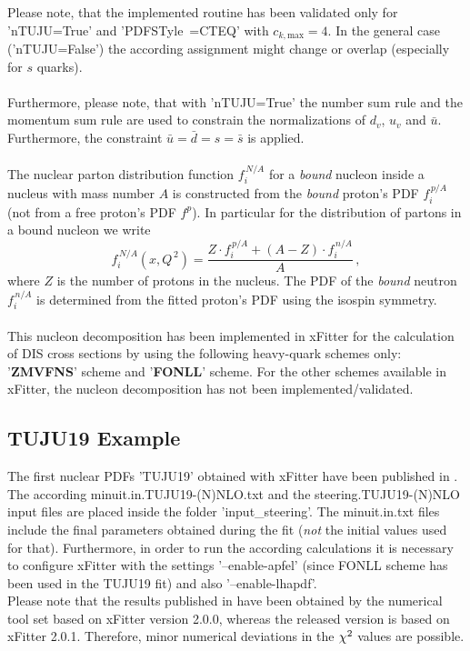 \documentclass{article}
\newcommand{\Chi}{\large{\chi}}
\begin{document}
\noindent Please note, that the implemented routine has been validated only for 'nTUJU=True' and '{PDFSTyle~=CTEQ}' with $c_{k,\mathrm{max}}=4$. In the general case ('nTUJU=False') the according assignment might change or overlap (especially for $s$ quarks).\\
\\
Furthermore, please note, that with 'nTUJU=True' the number sum rule and the momentum sum rule are used to constrain the normalizations of $d_v$, $u_v$ and $\bar{u}$. Furthermore, the constraint $\bar{u}=\bar{d}=s=\bar{s}$ is applied.\\
\\
The nuclear parton distribution function $f_i^{\,N/A}$ for a \textit{bound} nucleon inside a nucleus with mass number $A$ is constructed from the \textit{bound} proton's PDF $f_i^{\,p/A}$ (not from a free proton's PDF $f^p$). In particular for the distribution of partons in a bound nucleon we write
\begin{equation}
f_i^{\,N/A} \left( x,Q^{\,2} \right) = \frac{Z\cdot f_i^{\,p/A}+ (A-Z)\cdot f_i^{\,n/A}}{A}\,,
\label{eq:nucleon}
\end{equation} 
where $Z$ is the number of protons in the nucleus. The PDF of the \textit{bound} neutron~$f_i^{\,n/A}$ is determined from the fitted proton's PDF using the isospin symmetry.\\
\\
This nucleon decomposition has been implemented in xFitter for the calculation of DIS cross sections by using the following heavy-quark schemes only: '\textbf{ZMVFNS}' scheme and '\textbf{FONLL}' scheme. For the other schemes available in xFitter, the nucleon decomposition has not been implemented/validated.

\subsection{TUJU19 Example}

The first nuclear PDFs 'TUJU19' obtained with xFitter have been published in \cite{Walt:2019slu}. The according minuit.in.TUJU19-(N)NLO.txt and the steering.TUJU19-(N)NLO input files are placed inside the folder 'input\_steering'. The minuit.in.txt files include the final parameters obtained during the fit (\textit{not} the initial values used for that). Furthermore, in order to run the according calculations it is necessary to configure xFitter with the settings '--enable-apfel' (since FONLL scheme has been used in the TUJU19 fit) and also '--enable-lhapdf'.\\
Please note that the results published in \cite{Walt:2019slu} have been obtained by the numerical tool set based on xFitter version 2.0.0, whereas the released version is based on xFitter 2.0.1. Therefore, minor numerical deviations in the $\Chi^2$ values are possible.
\end{document}
